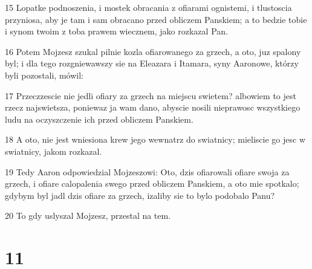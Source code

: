 \par 15 Lopatke podnoszenia, i mostek obracania z ofiarami ognistemi, i tlustoscia przyniosa, aby je tam i sam obracano przed obliczem Panskiem; a to bedzie tobie i synom twoim z toba prawem wiecznem, jako rozkazal Pan.
\par 16 Potem Mojzesz szukal pilnie kozla ofiarowanego za grzech, a oto, juz spalony byl; i dla tego rozgniewawszy sie na Eleazara i Itamara, syny Aaronowe, którzy byli pozostali, mówil:
\par 17 Przeczzescie nie jedli ofiary za grzech na miejscu swietem? albowiem to jest rzecz najswietsza, poniewaz ja wam dano, abyscie nosili nieprawosc wszystkiego ludu na oczyszczenie ich przed obliczem Panskiem.
\par 18 A oto, nie jest wniesiona krew jego wewnatrz do swiatnicy; mieliscie go jesc w swiatnicy, jakom rozkazal.
\par 19 Tedy Aaron odpowiedzial Mojzeszowi: Oto, dzis ofiarowali ofiare swoja za grzech, i ofiare calopalenia swego przed obliczem Panskiem, a oto mie spotkalo; gdybym byl jadl dzis ofiare za grzech, izaliby sie to bylo podobalo Panu?
\par 20 To gdy uslyszal Mojzesz, przestal na tem.

\chapter{11}


